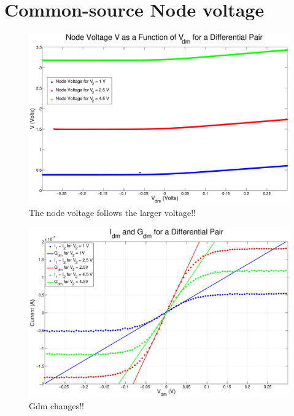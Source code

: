 \documentclass{article}
\begin{document}
\section*{Common-source Node voltage}


\begin{figure}[H]
\centering
\includegraphics[width=\linewidth]{./Figures/NodeVoltageWeakInversion.eps}
\caption{The node voltage follows the larger voltage!!}
\label{fig:nodevoltageWI}
\end{figure}


\begin{figure}[H]
\centering
\includegraphics[width=\linewidth]{./Figures/Gdm.eps}
\caption{Gdm changes!!}
\label{fig:gdm}
\end{figure}
\end{document}

